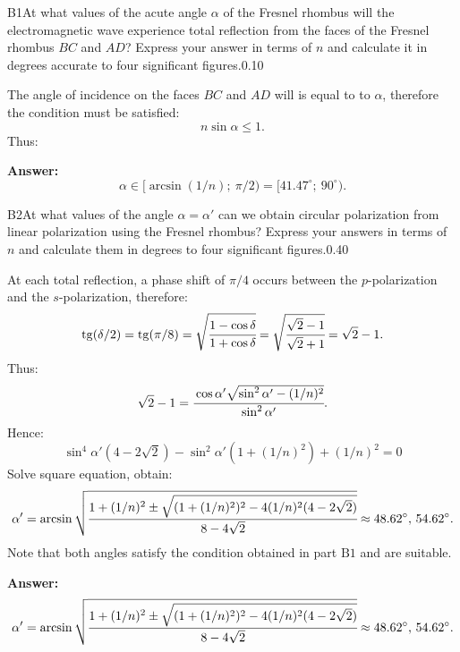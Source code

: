 \documentclass[11pt,a4paper]{article}
\begin{document}
\begin{solcard}{B1}{At what values of the acute angle $\alpha$ of the Fresnel rhombus will the electromagnetic wave experience total reflection from the faces of the Fresnel rhombus $BC$ and $AD$? Express your answer in terms of $n$ and calculate it in degrees accurate to four significant figures.}{0.10}

The angle of incidence on the faces $BC$ and $AD$ will is equal to to $\alpha$, therefore the condition must be satisfied: $$n\sin\alpha\leq 1{.} $$Thus:

\par\smallskip\noindent\textbf{Answer:} $$\alpha\in[\arcsin(1/n){;}~\pi/2)=[41{.}47^{\circ}{;}~90^{\circ}){.} $$
\end{solcard}

\begin{solcard}{B2}{At what values of the angle $\alpha=\alpha'$ can we obtain circular polarization from linear polarization using the Fresnel rhombus? Express your answers in terms of $n$ and calculate them in degrees to four significant figures.}{0.40}

At each total reflection, a phase shift of $\pi/4$ occurs between the $p$-polarization and the $s$-polarization, therefore: $$\operatorname{tg}(\delta/2)=\operatorname{tg}(\pi/8)=\sqrt{\cfrac{1-\cos\delta}{1+\cos\delta}}=\sqrt{\cfrac{\sqrt{2}-1}{\sqrt{2}+1}}=\sqrt{2}-1{.} $$Thus: $$\sqrt{2}-1=\cfrac{\cos\alpha'\sqrt{\sin^2\alpha'-(1/n)^2}}{\sin^2\alpha'}{.} $$Hence: $$\sin^4\alpha'(4-2\sqrt{2})-\sin^2\alpha'(1+(1/n)^2)+(1/n)^2=0 $$Solve square equation, obtain: $$\alpha'=\arcsin\sqrt{\cfrac{1+(1/n)^2\pm\sqrt{(1+(1/n)^2)^2-4(1/n)^2(4-2\sqrt{2})}}{8-4\sqrt{2}}}\approx 48{.}62^{\circ}{,}~54{.}62^{\circ}{.} $$Note that both angles satisfy the condition obtained in part $\mathrm{B1}$ and are suitable.

\par\smallskip\noindent\textbf{Answer:} $$\alpha'=\arcsin\sqrt{\cfrac{1+(1/n)^2\pm\sqrt{(1+(1/n)^2)^2-4(1/n)^2(4-2\sqrt{2})}}{8-4\sqrt{2}}}\approx 48{.}62^{\circ}{,}~54{.}62^{\circ}{.} $$
\end{solcard}
\end{document}
